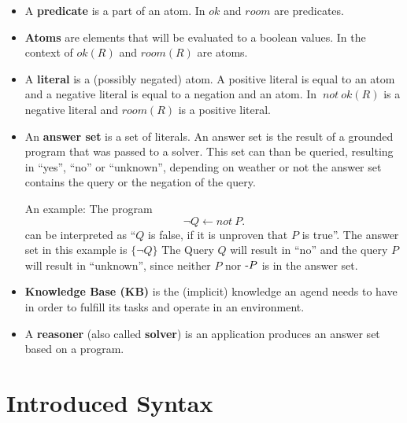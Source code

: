 \documentclass[runningheads]{llncs}
\begin{document}
\begin{itemize}
    \item A \textbf{predicate} is a part of an atom. In  $ok$ and $room$ are predicates.
    \item \textbf{Atoms} are elements that will be evaluated to a boolean values. In the context of  $ok(R)$ and $room(R)$ are atoms. 
    \item A \textbf{literal} is a (possibly negated) atom. A positive literal is equal to an atom and a negative literal is equal to a negation and an atom. In  $~ not ~ ok(R)$ is a negative literal and $room(R)$ is a positive literal. 
    \item An \textbf{answer set} \cite{gelfond1991classical} is a set of literals. An answer set is the result of a grounded program that was passed to a solver. This set can than be queried, resulting in ``yes'', ``no'' or ``unknown'', depending on weather or not the answer set contains the query or the negation of the query. 
    
    An example: The program  $$\neg Q \leftarrow not ~ P. $$ can be interpreted as ``$Q$ is false, if it is unproven that $P$ is true''. The answer set in this example is $\{\neg Q\}$ The Query $Q$ will result in ``no'' and the query $P$ will result in ``unknown'', since neither $P$ nor $\textrm{-} P$ is in the answer set.
    \item \textbf{Knowledge Base (KB)} is the (implicit) knowledge an agend needs to have in order to fulfill its tasks and operate in an environment.
    \item A \textbf{reasoner} (also called \textbf{solver}) is an application produces an answer set based on a program.
\end{itemize}

\section{Introduced Syntax}
\end{document}
